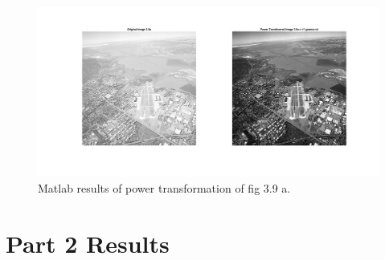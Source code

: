 \documentclass[./rarnold_report2.tex]{subfiles}
\begin{document}
	\begin{figure}[!htbp]
	\centering
	\includegraphics[scale=0.25]{"power_city"}
	\caption{Matlab results of power transformation of fig 3.9 a.} 
	\label{power_city}
	\end{figure}



\section*{Part 2 Results}
\end{document}
